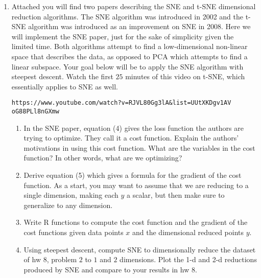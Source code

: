 \documentclass{article}
\begin{document}
\begin{enumerate}
\item Attached you will find two papers describing the SNE and t-SNE dimensional reduction algorithms.  The SNE algorithm was introduced in 2002 and the t-SNE algorithm was introduced as an improvement on SNE in 2008.   Here we will implement the SNE paper, just for the sake of simplicity given the limited time.  Both algorithms attempt to find a low-dimensional non-linear space that describes the data, as opposed to PCA which attempts to find a linear subspace. Your goal below will be to apply the SNE algorithm with steepest descent.  Watch the first $25$ minutes of this video on t-SNE, which essentially applies to SNE as well.
\begin{verbatim}
https://www.youtube.com/watch?v=RJVL80Gg3lA&list=UUtXKDgv1AV
oG88PLl8nGXmw
\end{verbatim} 
\begin{enumerate}
\item In the SNE paper, equation (4) gives the loss function the authors are trying to optimize.   They call it a cost function.   Explain the authors' motivations in using this cost function.   What are the variables in the cost function?  In other words, what are we optimizing?  
\item Derive equation (5) which gives a formula for the gradient of the cost function. As a start, you may want to assume that we are reducing to a single dimension, making each $y$ a scalar, but then make sure to generalize to any dimension.
\item Write R functions to compute the cost function and the gradient of the cost functions given data points $x$ and the dimensional reduced points $y$.  
\item  Using steepest descent, compute SNE to dimensionally reduce the dataset of hw $8$, problem $2$ to $1$ and $2$ dimensions.  Plot the 1-d and 2-d reductions produced by SNE and compare to your results in hw $8$.  
\end{enumerate}

\end{enumerate}
\end{document}
